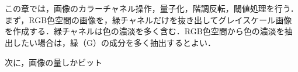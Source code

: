 \chapter{\kadaia}
\section{\purpose}
この章では，画像のカラーチャネル操作，量子化，階調反転，閾値処理を行う．
まず，RGB色空間の画像を，緑チャネルだけを抜き出してグレイスケール画像を作成する．緑チャネルは色の濃淡を多く含む．RGB色空間から色の濃淡を抽出したい場合は，緑（G）の成分を多く抽出するとよい．\par
次に，画像の量しかビット